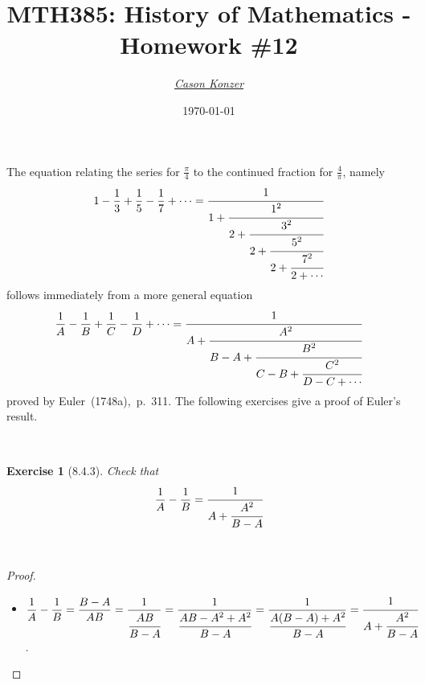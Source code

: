 \documentclass[12pt]{article}
\newcommand{\XB}{\color{black}}
\newcommand{\XBB}{\color{blue}}
\newcommand{\XV}{\color{violet}}
\newcommand{\ds}{\displaystyle}
\theoremstyle{plain}
\newtheorem{ex}{Exercise}
\begin{document}
\title{\textbf{MTH385}: History of Mathematics - Homework \#12}
\date{\today}
\author{\XV\textit{\large{\href{https://github.com/casonk}{Cason Konzer}}}\XB}

\maketitle

\hrulefill

\newpage

The equation relating the series for $\frac{\pi}{4}$ to the continued fraction for $\frac{4}{\pi}$, namely
\[
  1 - \frac{1}{3} + \frac{1}{5} - \frac{1}{7} + \cdots = \cfrac{1}{1 + \cfrac{1^{2}}{2 + \cfrac{3^{2}}{2 + \cfrac{5^{2}}{2 + \cfrac{7^{2}}{2 + \cdots}}}}}
\]
follows immediately from a more general equation
\[
  \frac{1}{A} - \frac{1}{B} + \frac{1}{C} - \frac{1}{D} + \cdots = \cfrac{1}{A + \cfrac{A^{2}}{B - A + \cfrac{B^{2}}{C - B + \cfrac{C^{2}}{D - C + \cdots}}}}
\]
proved by Euler~(1748a),~p.~311. The following exercises give a proof of Euler's result.


\XBB\hrulefill\XB \\
\begin{ex} [8.4.3]
  Check that
  \[
    \frac{1}{A} - \frac{1}{B} = \cfrac{1}{A + \cfrac{A^{2}}{B - A}}
  \]
\end{ex}
\XBB\hrulefill\XB \\

\begin{proof}
  \ \\

  \begin{itemize}
    \item $ \ds \frac{1}{A} - \frac{1}{B} = \frac{B - A}{AB} = \frac{1}{\cfrac{AB}{B -A}} = \frac{1}{\cfrac{AB - A^{2} + A^{2}}{B -A}} = \frac{1}{\cfrac{A(B - A) + A^{2}}{B -A}} = \cfrac{1}{A + \cfrac{A^{2}}{B - A}} $.
  \end{itemize}

\end{proof}

\newpage
\end{document}
